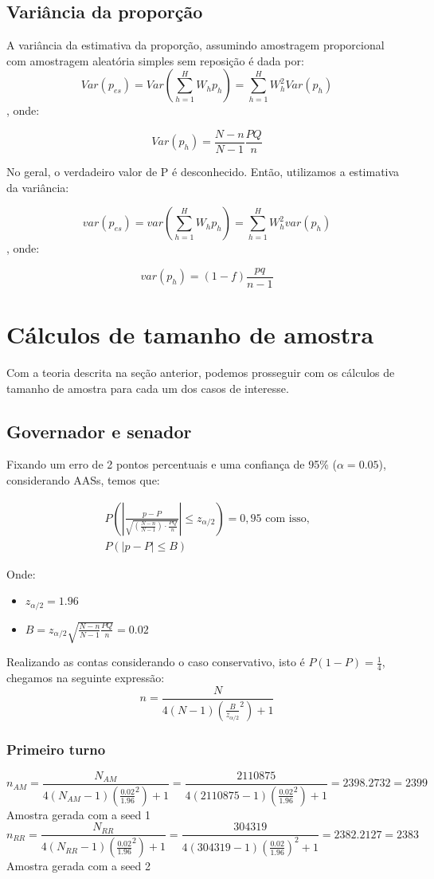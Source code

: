\documentclass{article}
\begin{document}
\subsection*{Variância da proporção}
A variância da estimativa da proporção, assumindo amostragem proporcional com amostragem aleatória simples sem reposição é dada por:
\[
Var(p_{es}) = Var(\sum_{h = 1}^{H}W_h p_h) = \sum_{h = 1}^{H}W_h ^ 2 Var(p_h)
\], onde:

\[
Var(p_h) = \frac{N-n}{N-1}\frac{PQ}{n}
\]

No geral, o verdadeiro valor de P é desconhecido. Então, utilizamos a estimativa da variância:

\[
var(p_{es}) = var(\sum_{h = 1}^{H}W_h p_h) = \sum_{h = 1}^{H}W_h ^ 2 var(p_h)
\], onde:

\[
var(p_h) = (1-f)\frac{pq}{n-1}
\]


\section*{Cálculos de tamanho de amostra}
Com a teoria descrita na seção anterior, podemos prosseguir com os cálculos de tamanho de amostra para
cada um dos casos de interesse.

\subsection*{Governador e senador}

Fixando um erro de 2 pontos percentuais e uma confiança de 95\% ($\alpha = 0.05$), considerando AASs, temos que:

\[
\begin{array}{l}
P\left( \left| \frac{p - P}{\sqrt{ \left( \frac{N - n}{N - 1} \right) \cdot \frac{PQ}{n} }} \right| \leq z_{\alpha/2} \right) = 0{,}95 \text{ com isso,}\\ 
P\left( \left| p - P \right| \leq B \right)
\end{array}
\]

Onde:
\begin{itemize}
    \item $z_{\alpha/2} = 1.96$
    \item $B = z_{\alpha/2}\sqrt{\frac{N-n}{N-1}\frac{PQ}{n}} = 0.02$
\end{itemize}

Realizando as contas considerando o caso conservativo, isto é $P(1-P) = \frac{1}{4}$, chegamos na seguinte expressão:
\[
n = \frac{N}{4(N-1)(\frac{B}{z_{\alpha/2}}^2) + 1}
\]
\subsubsection*{Primeiro turno}
\[
n_{AM} = \frac{N_{AM}}{4(N_{AM}-1)(\frac{0.02}{1.96}^2) + 1 } = \frac{2110875}{4(2110875 - 1) (\frac{0.02}{1.96}^2) + 1} = 2398.2732 = 2399
\]
Amostra gerada com a seed 1
\[
n_{RR} = \frac{N_{RR}}{4(N_{RR}-1)(\frac{0.02}{1.96}^2) + 1 } = \frac{304319}{4(304319-1)(\frac{0.02}{1.96})^2 + 1} = 2382.2127 = 2383
\]
Amostra gerada com a seed 2
\end{document}
